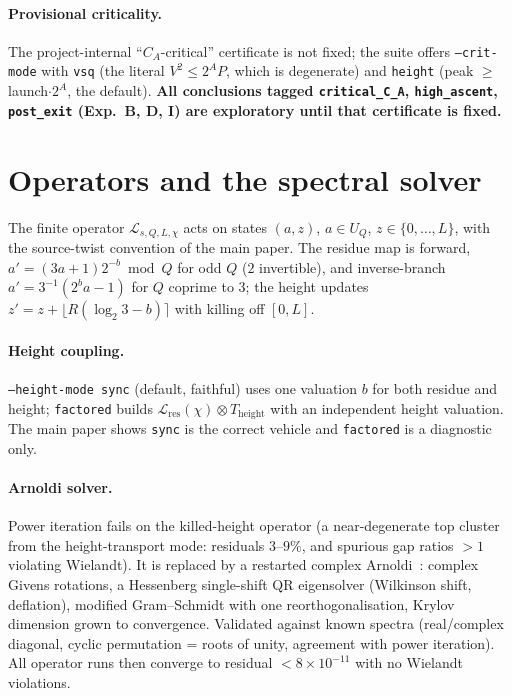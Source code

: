 \documentclass[11pt]{article}
\newcommand{\Lcal}{\mathcal{L}}
\theoremstyle{remark}
\begin{document}
\paragraph{Provisional criticality.} The project-internal ``$C_A$-critical''
certificate is not fixed; the suite offers \texttt{--crit-mode} with
\texttt{vsq} (the literal $V^2\le2^AP$, which is degenerate) and \texttt{height}
(peak $\ge$ launch$\cdot2^A$, the default). \textbf{All conclusions tagged
\texttt{critical\_C\_A}, \texttt{high\_ascent}, \texttt{post\_exit} (Exp.\ B, D,
I) are exploratory until that certificate is fixed.}

\section{Operators and the spectral solver}

The finite operator $\Lcal_{s,Q,L,\chi}$ acts on states $(a,z)$, $a\in U_Q$,
$z\in\{0,\dots,L\}$, with the source-twist convention of the main paper. The
residue map is forward, $a'=(3a+1)2^{-b}\bmod Q$ for odd $Q$ ($2$ invertible),
and inverse-branch $a'=3^{-1}(2^ba-1)$ for $Q$ coprime to $3$; the height updates
$z'=z+\lfloor R(\log_2 3-b)\rceil$ with killing off $[0,L]$.

\paragraph{Height coupling.} \texttt{--height-mode sync} (default, faithful) uses
one valuation $b$ for both residue and height; \texttt{factored} builds
$\Lcal_{\mathrm{res}}(\chi)\otimes T_{\mathrm{height}}$ with an independent height
valuation. The main paper shows \texttt{sync} is the correct vehicle and
\texttt{factored} is a diagnostic only.

\paragraph{Arnoldi solver.} Power iteration fails on the killed-height operator
(a near-degenerate top cluster from the height-transport mode: residuals
$3$--$9\%$, and spurious gap ratios $>1$ violating Wielandt). It is replaced by a
restarted complex Arnoldi~\cite{arnoldi1951,saad2011}: complex Givens rotations, a Hessenberg single-shift QR
eigensolver (Wilkinson shift, deflation), modified Gram--Schmidt with one
reorthogonalisation, Krylov dimension grown to convergence. Validated against
known spectra (real/complex diagonal, cyclic permutation = roots of unity,
agreement with power iteration). All operator runs then converge to residual
$<8\times10^{-11}$ with no Wielandt violations.
\end{document}
